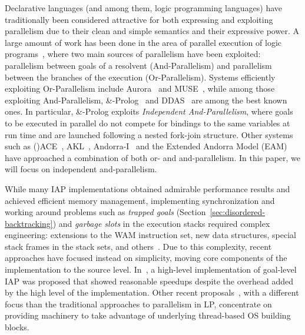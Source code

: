 \documentclass{tlp}
\newcounter{mnotei} \setcounter{mnotei}{0}
\newcommand{\mnote}[1]{{\scriptsize\textsf{\textcolor{blue}{}}}\marginpar{\scriptsize\textsf{\textcolor{red}{n.\themnotei: #1}}}\stepcounter{mnotei} }
\renewcommand{\mnote}[1]{}
\begin{document}
Declarative languages (and among them, logic programming languages)
have traditionally been considered attractive for both expressing and
exploiting parallelism due to their clean and simple 
semantics and their expressive power.  A
large amount of work has been done in the area of parallel execution of
logic programs~\cite{partut-toplas}, where two main sources of
parallelism have been exploited: parallelism between goals of a
resolvent (And-Parallelism) and parallelism between the branches 
of the execution (Or-Parallelism).
Systems efficiently exploiting Or-Parallelism include 
Aurora~\cite{aurora} and MUSE~\cite{muse},
while among those 
exploiting
And-Parallelism,
\&-Prolog~\cite{ngc-and-prolog} and DDAS~\cite{ddas-jlp} are among the
best known ones.  In particular, \&-Prolog exploits \emph{Independent
  And-Parallelism}, where goals to be executed in parallel do not 
compete for bindings to the same variables at run time and are
launched following a nested fork-join structure.
Other systems such as ()ACE~\cite{and-ace-ipps95},
AKL~\cite{sverker-phd}, Andorra-I~\cite{vitor-phd} and the Extended
Andorra Model (EAM)~\cite{eam91,BEAMTPLP2011} have approached a combination of
both or- and and-parallelism. In this paper, we will focus on
independent and-parallelism.

While many IAP implementations
obtained
admirable performance results and achieved efficient memory management, 
implementing synchronization and 
working around problems such as
\emph{trapped goals} (Section~\ref{sec:disordered-backtracking}) and
\emph{garbage slots} in the execution stacks required complex
engineering: extensions to the WAM instruction set, new data
structures,  special stack frames in the stack sets, and
others~\cite{hermenegildo-phd-short}.  Due to this complexity, 
recent approaches have focused instead on simplicity, moving core
components of the implementation to the source level.
In~\cite{hlfullandpar-iclp2008}, a high-level implementation of
goal-level IAP was proposed that showed reasonable speedups despite
the overhead added by the high level of the implementation.
Other recent proposals~\cite{moura08:padl}, with a different focus
than the traditional approaches to parallelism in LP, concentrate
on providing machinery to take advantage of underlying thread-based
OS building blocks.\mnote{We may
  remove this sentence / ref. if we are short in space.}
\end{document}
